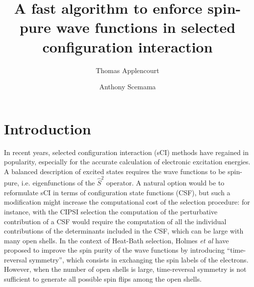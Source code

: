 \documentclass[aip,jcp,reprint,showkeys]{revtex4-1}
\newcommand{\alert}[1]{\textcolor{red}{#1}}
\newcommand{\stwo}{\hat{S}^2}
\begin{document}
\title{A fast algorithm to enforce spin-pure wave functions in selected configuration interaction}

\author{Thomas Applencourt}
\affiliation{ \alert{Mets ici ton affiliation} }
\author{Anthony Scemama}

\begin{abstract}
\end{abstract}


\maketitle

\section{Introduction}

In recent years, selected configuration interaction (sCI) methods have regained in
popularity,\cite{Greer_1998,Stampfuss_2005,Bytautas_2009,Booth_2009,Giner_2013,Buenker_2014,Holmes_2016,Ohtsuka_2017,Coe_2018}
especially for the accurate calculation of electronic excitation
energies.\cite{Coe_2013,Schriber_2017,Holmes_2017,Loos_2018,Scemama_2018,Dash_2018}
A balanced description of excited states requires the wave functions to be
spin-pure, i.e. eigenfunctions of the $\stwo$ operator.
A natural option would be to reformulate sCI in terms of configuration state
functions (CSF), but such a modification might increase the computational cost
of the selection procedure: for instance, with the CIPSI
selection\cite{Bender_1969,Whitten_1969,Huron_1973} the computation of the
perturbative contribution of a CSF would require the computation of all the
individual contributions of the determinants included in the CSF, which can
be large with many open shells.
In the context of Heat-Bath selection, Holmes \textit{et al} have proposed to
improve the spin purity of the wave functions by introducing ``time-reversal
symmetry''\cite{Holmes_2017}, which consists in exchanging the spin labels of
the electrons.
However, when the number of open shells is large, time-reversal symmetry is not
sufficient to generate all possible spin flips among the open shells.
\end{document}
